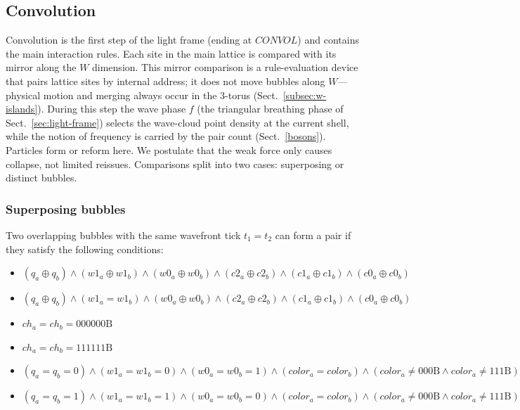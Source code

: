 \documentclass{ijuc}
\begin{document}
\subsection{Convolution} \label{subsec:convolution}
Convolution is the first step of the light frame (ending at $CONVOL$) and contains the main interaction rules. Each site in the main lattice is compared with its mirror along the $W$ dimension. This mirror comparison is a rule-evaluation device that pairs lattice sites by internal address; it does not move bubbles along $W$---physical motion and merging always occur in the 3-torus (Sect.~\ref{subsec:w-islands}). During this step the wave phase $f$ (the triangular breathing phase of Sect.~\ref{sec:light-frame}) selects the wave-cloud point density at the current shell, while the notion of frequency is carried by the pair count (Sect.~\ref{bosons}). Particles form or reform here. We postulate that the weak force only causes collapse, not limited reissues. Comparisons split into two cases: superposing or distinct bubbles.

\subsubsection{Superposing bubbles}
Two overlapping bubbles with the same wavefront tick $t_1=t_2$ can form a pair if they satisfy the following conditions:
\begin{itemize}
\item
$ (q_a \oplus q_b) \land (w1_a \oplus w1_b) \land (w0_a \oplus w0_b) \land (c2_a \oplus c2_b) \land (c1_a \oplus c1_b) \land (c0_a \oplus c0_b) $
\item

$ (q_a \oplus q_b) \land (w1_a = w1_b) \land (w0_a \oplus w0_b) \land (c2_a \oplus c2_b) \land (c1_a \oplus c1_b) \land (c0_a \oplus c0_b) $
\item

$ ch_a = ch_b = 000000\mathrm{B} $
\item

$ ch_a = ch_b = 111111\mathrm{B} $
\item

$ (q_a = q_b = 0) \land (w1_a = w1_b = 0) \land (w0_a = w0_b = 1) \land (color_a = color_b) \land (color_a \neq 000\mathrm{B} \land color_a \neq 111\mathrm{B}) $
\item

$ (q_a = q_b = 1) \land (w1_a = w1_b = 1) \land (w0_a = w0_b = 0) \land (color_a = color_b) \land (color_a \neq 000\mathrm{B} \land color_a \neq 111\mathrm{B}) $

\end{itemize}
\end{document}

